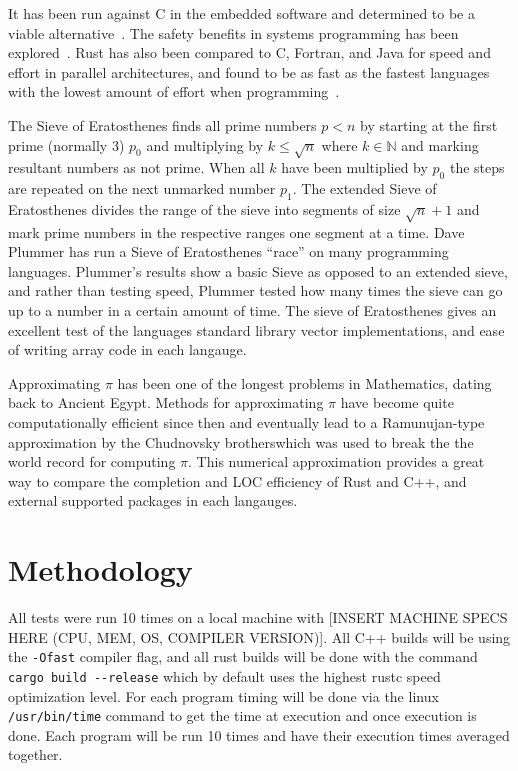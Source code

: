 \documentclass[10pt]{IEEEtran}
\begin{document}
It has been run against C in the embedded software and determined to be a viable alternative~\cite{borgsmuller2021rust}. 
The safety benefits in systems programming has been explored~\cite{BalasubramanianProceedings}. 
Rust has also been compared to C, Fortran, and Java for speed and effort in parallel architectures, 
and found to be as fast as the fastest languages with the lowest amount of effort when programming~\cite{costanzo2021performance}\cite{heyman2020comparison}.
\par
The Sieve of Eratosthenes finds all prime numbers $p<n$ by starting at the first prime (normally 3) $p_0$ and multiplying by $k \leq \sqrt{n}$ where $k \in \mathbb{N}$ and marking resultant numbers as not prime.
When all $k$ have been multiplied by $p_0$ the steps are repeated on the next unmarked number $p_1$.
The extended Sieve of Eratosthenes divides the range of the sieve into segments of size $\sqrt{n}+1$ and mark prime numbers in the respective ranges one segment at a time.
Dave Plummer has run a Sieve of Eratosthenes “race” on many programming languages\cite{plummer}. 
Plummer's results show a basic Sieve as opposed to an extended sieve, and rather than testing speed, Plummer tested how many times 
the sieve can go up to a number in a certain amount of time. 
The sieve of Eratosthenes gives an excellent test of the languages standard library vector implementations, and ease of writing array code in each langauge.
\par
Approximating $\pi$ has been one of the longest problems in Mathematics, dating back to Ancient Egypt\cite{burton}. Methods for approximating $\pi$ have become quite computationally efficient since then and eventually 
lead to a Ramunujan-type approximation by the Chudnovsky brotherswhich was used to break the the world record for computing $\pi$\cite{lynn}.
This numerical approximation provides a great way to compare the completion and LOC efficiency of Rust and C++, and external supported packages in each langauges.

\section{Methodology}
All tests were run 10 times on a local machine with [INSERT MACHINE SPECS HERE (CPU, MEM, OS, COMPILER VERSION)]. All C++ builds will be using the \verb|-Ofast| 
compiler flag, and all rust builds will be done with the command \verb|cargo build --release| which by default 
uses the highest rustc speed optimization level\cite{cargobook}. For each program timing will be done via the linux \verb|/usr/bin/time| command to get the time at execution and once execution is done.
Each program will be run 10 times and have their execution times averaged together.
\end{document}
